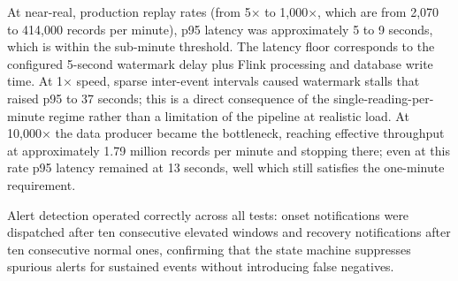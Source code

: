At near-real, production replay rates (from 5× to 1,000×, which are from 2,070 to 414,000 records per minute), p95 latency was approximately 5 to 9 seconds, which is within the sub-minute threshold. The latency floor corresponds to the configured 5-second watermark delay plus Flink processing and database write time. At 1× speed, sparse inter-event intervals caused watermark stalls that raised p95 to 37 seconds; this is a direct consequence of the single-reading-per-minute regime rather than a limitation of the pipeline at realistic load. At 10,000× the data producer became the bottleneck, reaching effective throughput at approximately 1.79 million records per minute and stopping there; even at this rate p95 latency remained at 13 seconds, well which still satisfies the one-minute requirement.

Alert detection operated correctly across all tests: onset notifications were dispatched after ten consecutive elevated windows and recovery notifications after ten consecutive normal ones, confirming that the state machine suppresses spurious alerts for sustained events without introducing false negatives.
